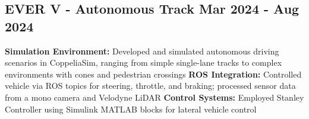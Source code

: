 \subsection*{
  EVER V - Autonomous Track
  \hspace*{\fill}
  \dateformat Mar 2024 - Aug 2024
}
\begin{tasks}
  \task \textbf{Simulation Environment:} Developed and simulated autonomous driving scenarios in CoppeliaSim, ranging from simple single-lane tracks to complex environments with cones and pedestrian crossings
  \task \textbf{ROS Integration:} Controlled vehicle via ROS topics for steering, throttle, and braking; processed sensor data from a mono camera and Velodyne LiDAR
  \task \textbf{Control Systems:} Employed Stanley Controller using Simulink MATLAB blocks for lateral vehicle control
\end{tasks}
%
%
%
%
%
%
%
%
%
%

